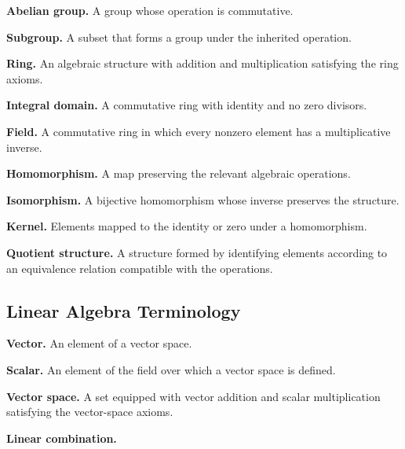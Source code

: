 \medskip

\textbf{Abelian group.}
A group whose operation is commutative.

\medskip

\textbf{Subgroup.}
A subset that forms a group under the inherited operation.

\medskip

\textbf{Ring.}
An algebraic structure with addition and multiplication satisfying the ring
axioms.

\medskip

\textbf{Integral domain.}
A commutative ring with identity and no zero divisors.

\medskip

\textbf{Field.}
A commutative ring in which every nonzero element has a multiplicative
inverse.

\medskip

\textbf{Homomorphism.}
A map preserving the relevant algebraic operations.

\medskip

\textbf{Isomorphism.}
A bijective homomorphism whose inverse preserves the structure.

\medskip

\textbf{Kernel.}
Elements mapped to the identity or zero under a homomorphism.

\medskip

\textbf{Quotient structure.}
A structure formed by identifying elements according to an equivalence
relation compatible with the operations.

\subsection{Linear Algebra Terminology}
\label{subsec:linear-algebra-terminology}

\textbf{Vector.}
An element of a vector space.

\medskip

\textbf{Scalar.}
An element of the field over which a vector space is defined.

\medskip

\textbf{Vector space.}
A set equipped with vector addition and scalar multiplication satisfying the
vector-space axioms.

\medskip

\textbf{Linear combination.}

